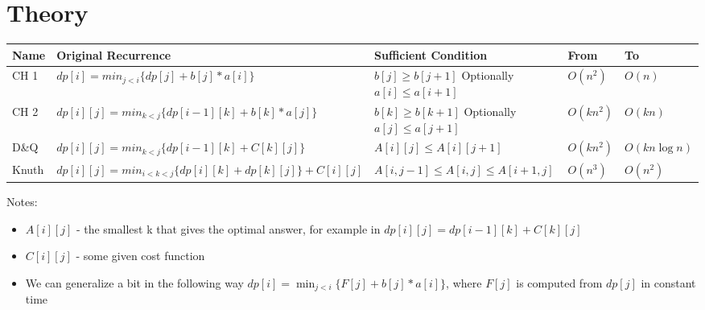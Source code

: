 \section{Theory}

\begin{tabular}{|p{0.8cm}| p{4.5cm}| p{3.3cm}|p{0.9cm}| p{1.3cm}|}
	\hline
	Name & Original Recurrence & Sufficient Condition & From  & To  \\ 
	\hline
	CH 1 & $dp[i] = min_{j<i}\{dp[j]+b[j]*a[i ]\}$ & $b[j] \geq b[j+1]$ Optionally $a[i] \leq a[i+1]$ & $O(n^2)$ & $O(n)$ \\ 
	\hline
	CH 2 & $dp[i][j] = min_{k<j}\{dp[i-1][k] + b[k] * a[j]\}$ & $b[k] \geq b[k+1]$ Optionally $a[j] \leq a[j+1]$ & $O(kn^2)$ & $O(kn)$ \\ 
	\hline
	D\&Q & $dp[i][j] = min_{k<j}\{dp[i-1][k] + C[k][j]\}$ & $A[i][j] \leq A[i][j+1]$ & $O(kn^2)$ & $O(kn\log n)$ \\ 
	\hline
	Knuth & $dp[i][j] = min_{i<k<j} \{dp[i][k] + dp[k][j] \} + C[i][j] $ & $A[i, j -1] \leq A[i, j] \leq A[i+1, j]$ & $O(n^3)$ & $O(n^2)$ \\ 
	\hline
\end{tabular} 

Notes:

\begin{itemize}
	\item $A[i][j]$ - the smallest k that gives the optimal answer, for example in $dp[i][j] = dp[i-1][k] + C[k][j]$
	\item $C[i][j]$ - some given cost function
	\item We can generalize a bit in the following way $dp[i] = \min_{j<i}\{F[j]+b[j] * a[i]\}$, where $F[j]$ is computed from $dp[j]$ in constant time
\end{itemize}





